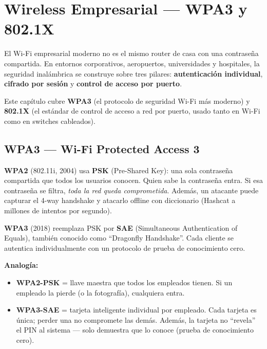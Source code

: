 \chapter{ Wireless Empresarial --- WPA3 y 802.1X}

\begin{concepto}
El Wi-Fi empresarial moderno no es el mismo router de casa con una contraseña
compartida. En entornos corporativos, aeropuertos, universidades y hospitales,
la seguridad inalámbrica se construye sobre tres pilares:
\textbf{autenticación individual}, \textbf{cifrado por sesión} y
\textbf{control de acceso por puerto}.

Este capítulo cubre \textbf{WPA3} (el protocolo de seguridad Wi-Fi más moderno)
y \textbf{802.1X} (el estándar de control de acceso a red por puerto, usado tanto
en Wi-Fi como en switches cableados).
\end{concepto}

\section{ WPA3 --- Wi-Fi Protected Access 3}

\begin{concepto}
\textbf{WPA2} (802.11i, 2004) usa \textbf{PSK} (Pre-Shared Key): una sola
contraseña compartida que todos los usuarios conocen. Quien sabe la contraseña
entra. Si esa contraseña se filtra, \textit{toda la red queda comprometida}.
Además, un atacante puede capturar el 4-way handshake y atacarlo offline
con diccionario (Hashcat a millones de intentos por segundo).

\textbf{WPA3} (2018) reemplaza PSK por \textbf{SAE} (Simultaneous Authentication
of Equals), también conocido como ``Dragonfly Handshake''. Cada cliente se
autentica individualmente con un protocolo de prueba de conocimiento cero.

 \textbf{Analogía:}
\begin{itemize}
    \item \textbf{WPA2-PSK} = llave maestra que todos los empleados tienen.
          Si un empleado la pierde (o la fotografía), cualquiera entra.
    \item \textbf{WPA3-SAE} = tarjeta inteligente individual por empleado.
          Cada tarjeta es única; perder una no compromete las demás.
          Además, la tarjeta no ``revela'' el PIN al sistema --- solo demuestra
          que lo conoce (prueba de conocimiento cero).
\end{itemize}
\end{concepto}

